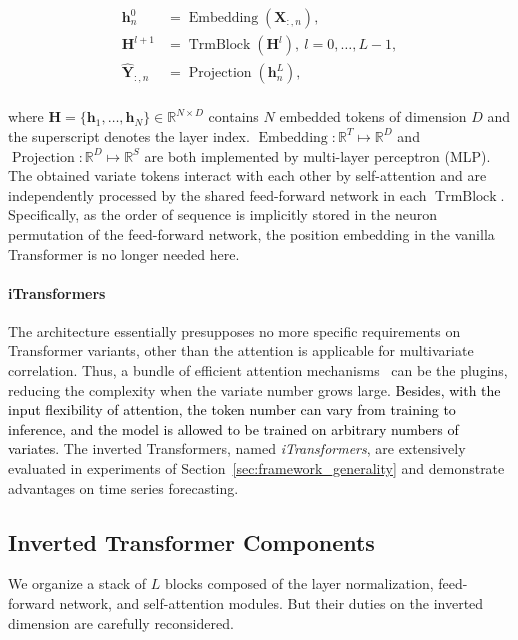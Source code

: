 \documentclass{article} %
\newcommand{\update}[1]{{\textcolor{black}{#1}}}
\begin{document}
 \begin{equation}
 \begin{aligned}
     \mathbf{h}^{0}_n &= \operatorname{Embedding}(\mathbf{X}_{:,n}), \\
    \mathbf{H}^{l+1} &= \operatorname{TrmBlock}(\mathbf{H}^{l}),\ l=0,\dots, L-1, \\
     \hat{\mathbf{Y}}_{:,n} &= \operatorname{Projection}(\mathbf{h}^{L}_n), \\
\end{aligned}
\end{equation}

where $\mathbf{H}=\{\mathbf{h}_1,\dots,\mathbf{h}_N\}\in\mathbb{R}^{N\times D}$ contains $N$ embedded tokens of dimension ${D}$ and the superscript denotes the layer index. $\operatorname{Embedding}: \mathbb{R}^T \mapsto \mathbb{R}^D$ and $\operatorname{Projection}: \mathbb{R}^D \mapsto \mathbb{R}^S$ are both implemented by multi-layer perceptron (MLP). The obtained variate tokens interact with each other by self-attention and are independently processed by the shared feed-forward network in each $\operatorname{TrmBlock}$. Specifically, as the order of sequence is implicitly stored in the neuron permutation of the feed-forward network, the position embedding in the vanilla Transformer is no longer needed here.

\paragraph{iTransformers} The architecture essentially presupposes no more specific requirements on Transformer variants, other than the attention is applicable for multivariate correlation. Thus, a bundle of efficient attention mechanisms~\citep{Informer, wu2022flowformer, dao2022flashattention} can be the plugins, reducing the complexity when the variate number grows large. \update{Besides, with the input flexibility of attention, the token number can vary from training to inference, and the model is allowed to be trained on arbitrary numbers of variates}. The inverted Transformers, named \emph{iTransformers}, are extensively evaluated in experiments of Section~\ref{sec:framework_generality} and demonstrate advantages on time series forecasting.

\subsection{Inverted Transformer Components}

We organize a stack of $L$ blocks composed of the layer normalization, feed-forward network, and self-attention modules. But their duties on the inverted dimension are carefully reconsidered.
\end{document}
